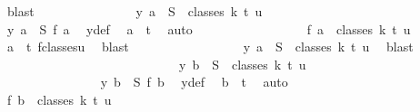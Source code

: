 \begin{isabellebody}
\ blast\isanewline
\ \ \ \ \ \ \ \ \ \ \ \ \isamarkupfalse%
\ \isamarkupfalse%
\ {\isachardoublequoteopen}y\ a\ {\isasymin}\ S\ {\isacharbackquote}{\kern0pt}\ classes\ k\ t\ u{\isachardoublequoteclose}\isanewline
\ \ \ \ \ \ \ \ \ \ \ \ \isamarkupfalse%
\ {\isacharminus}{\kern0pt}\isanewline
\ \ \ \ \ \ \ \ \ \ \ \ \ \ \isamarkupfalse%
\ {\isachardoublequoteopen}y\ a\ {\isacharequal}{\kern0pt}\ S\ {\isacharparenleft}{\kern0pt}{\isacharquery}{\kern0pt}f\ a{\isacharparenright}{\kern0pt}{\isachardoublequoteclose}\ \isamarkupfalse%
\ y{\isacharunderscore}{\kern0pt}def\ \isamarkupfalse%
\ {\isacartoucheopen}a\ {\isacharless}{\kern0pt}\ t{\isacartoucheclose}\ \isamarkupfalse%
\ auto\isanewline
\ \ \ \ \ \ \ \ \ \ \ \ \ \ \isamarkupfalse%
\ \isamarkupfalse%
\ {\isachardoublequoteopen}{\isacharquery}{\kern0pt}f\ a\ {\isasymin}\ classes\ k\ t\ u{\isachardoublequoteclose}\ \isamarkupfalse%
\ {\isacartoucheopen}a\ {\isacharless}{\kern0pt}\ t{\isacartoucheclose}\ f{\isacharunderscore}{\kern0pt}classes{\isacharunderscore}{\kern0pt}u\ \isamarkupfalse%
\ blast\isanewline
\ \ \ \ \ \ \ \ \ \ \ \ \ \ \isamarkupfalse%
\ \isamarkupfalse%
\ {\isachardoublequoteopen}y\ a\ {\isasymin}\ S\ {\isacharbackquote}{\kern0pt}\ classes\ k\ t\ u{\isachardoublequoteclose}\ \isamarkupfalse%
\ blast\isanewline
\ \ \ \ \ \ \ \ \ \ \ \ \isamarkupfalse%
\isanewline
\ \ \ \ \ \ \ \ \ \ \ \ \isamarkupfalse%
\ \isamarkupfalse%
\ {\isachardoublequoteopen}y\ b\ {\isasymin}\ S\ {\isacharbackquote}{\kern0pt}\ classes\ k\ t\ u{\isachardoublequoteclose}\isanewline
\ \ \ \ \ \ \ \ \ \ \ \ \isamarkupfalse%
\ {\isacharminus}{\kern0pt}\isanewline
\ \ \ \ \ \ \ \ \ \ \ \ \ \ \isamarkupfalse%
\ {\isachardoublequoteopen}y\ b\ {\isacharequal}{\kern0pt}\ S\ {\isacharparenleft}{\kern0pt}{\isacharquery}{\kern0pt}f\ b{\isacharparenright}{\kern0pt}{\isachardoublequoteclose}\ \isamarkupfalse%
\ y{\isacharunderscore}{\kern0pt}def\ \isamarkupfalse%
\ {\isacartoucheopen}b\ {\isacharless}{\kern0pt}\ t{\isacartoucheclose}\ \isamarkupfalse%
\ auto\isanewline
\ \ \ \ \ \ \ \ \ \ \ \ \ \ \isamarkupfalse%
\ \isamarkupfalse%
\ {\isachardoublequoteopen}{\isacharquery}{\kern0pt}f\ b\ {\isasymin}\ classes\ k\ t\ u{\isachardoublequoteclose}\ \isamarkupfalse%

\end{isabellebody}
